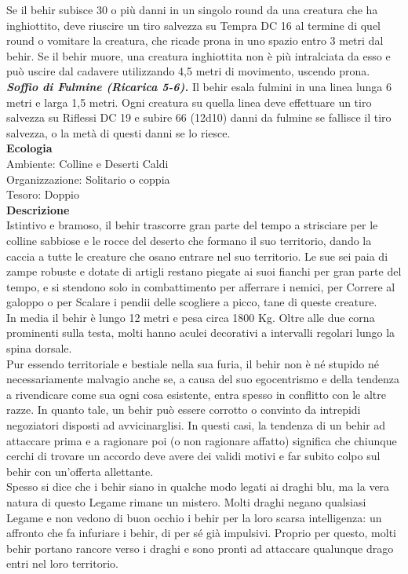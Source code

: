 \begin{multicols}{2}
Se il behir subisce 30 o più danni in un singolo round da una creatura che ha inghiottito, deve riuscire un tiro salvezza su Tempra DC  16 al termine di quel round o vomitare la creatura, che ricade prona in uno spazio entro 3 metri dal behir. Se il behir muore, una creatura inghiottita non è più intralciata da esso e può uscire dal cadavere utilizzando 4,5 metri di movimento, uscendo prona.\\
\emph{\textbf{Soffio di Fulmine (Ricarica 5-6).}} Il behir esala fulmini in una linea lunga 6 metri e larga 1,5 metri. Ogni creatura su quella linea deve effettuare un tiro salvezza su Riflessi DC  19 e subire 66 (12d10) danni da fulmine se fallisce il tiro salvezza, o la metà di questi danni se lo riesce.\\
\textbf{Ecologia}\\
Ambiente: Colline e Deserti Caldi\\
Organizzazione: Solitario o coppia\\
Tesoro: Doppio\\
\textbf{Descrizione}\\
Istintivo e bramoso, il behir trascorre gran parte del tempo a strisciare per le colline sabbiose e le rocce del deserto che formano il suo territorio, dando la caccia a tutte le creature che osano entrare nel suo territorio. Le sue sei paia di zampe robuste e dotate di artigli restano piegate ai suoi fianchi per gran parte del tempo, e si stendono solo in combattimento per afferrare i nemici, per Correre al galoppo o per Scalare i pendii delle scogliere a picco, tane di queste creature.\\
In media il behir è lungo 12 metri e pesa circa 1800 Kg. Oltre alle due corna prominenti sulla testa, molti hanno aculei decorativi a intervalli regolari lungo la spina dorsale.\\
Pur essendo territoriale e bestiale nella sua furia, il behir non è né stupido né necessariamente malvagio anche se, a causa del suo egocentrismo e della tendenza a rivendicare come sua ogni cosa esistente, entra spesso in conflitto con le altre razze. In quanto tale, un behir può essere corrotto o convinto da intrepidi negoziatori disposti ad avvicinarglisi. In questi casi, la tendenza di un behir ad attaccare prima e a ragionare poi (o non ragionare affatto) significa che chiunque cerchi di trovare un accordo deve avere dei validi motivi e far subito colpo sul behir con un’offerta allettante.\\
Spesso si dice che i behir siano in qualche modo legati ai draghi blu, ma la vera natura di questo Legame rimane un mistero. Molti draghi negano qualsiasi Legame e non vedono di buon occhio i behir per la loro scarsa intelligenza: un affronto che fa infuriare i behir, di per sé già impulsivi. Proprio per questo, molti behir portano rancore verso i draghi e sono pronti ad attaccare qualunque drago entri nel loro territorio.\\


\end{multicols}
